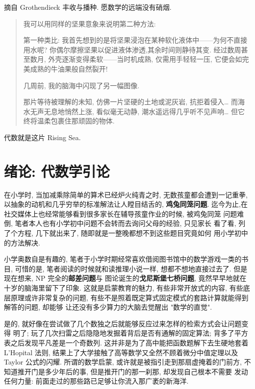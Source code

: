 \documentclass[UTF8]{book}
\begin{document}
\vspace*{5em}

摘自 Grothendieck 丰收与播种. 愿数学的远端没有硝烟. 

\begin{quotation}
    
    \kaishu   
    我可以用同样的坚果意象来说明第二种方法: 
    
    第一种类比: 
    我首先想到的是将坚果浸泡在某种软化液体中——为何不直接用水呢? 
    你偶尔摩擦坚果以促进液体渗透,其余时间则静待其变. 
    经过数周甚至数月, 外壳逐渐变得柔软——当时机成熟, 仅需用手轻轻一压, 
    它便会如完美成熟的牛油果般自然裂开! 

    几周前, 我的脑海中闪现了另一幅图像. 
      
    那片等待被理解的未知, 仿佛一片坚硬的土地或泥灰岩, 抗拒着侵入\dots
    而海水无声无息地悄然上涨, 看似毫无动静, 潮水遥远得几乎听不见声响\dots 
    但它终将温柔包裹住那顽固的物体. 
    
\end{quotation}

代数就是这片 Rising Sea. 

\chapter{绪论: 代数学引论}


在小学时, 当加减乘除简单的算术已经炉火纯青之时, 无数孩童都会遭到一记重拳, 
以抽象的动机和几乎穷举的标准解法让人瞠目结舌的, \textbf{鸡兔同笼问题}. 
迄今为止,在社交媒体上也经常能够看到很多家长在辅导孩童作业的时候, 被鸡兔同笼
问题难倒, 笔者本人也有小学初中问题不会转而去询问父母的经验, 只见家长
看了看, 列了个方程, 几下就出来了, 随即就是一整晚都想不到这些题目究竟如何
用小学初中的方法解决. 

小学奥数自是有趣的, 笔者于小学时期经常喜欢借阅图书馆中的数学游戏一类的书目, 
可惜的是, 笔者阅读的时候就和读推理小说一样, 想都不想地直接过去了. 
但是现在想来, NP 完全的\textbf{邮差问题}与
图论诞生的\textbf{戈尼斯堡七桥问题}, 竟然早早地就在
十岁的脑海里留下了印象. 
这就是启蒙教育的魅力, 有些非常开放式的内容, 有些底层原理或许非常复杂的问题, 
有些不是照着既定算式固定模式的套路计算就能得到解答的问题, 却能够
让还没有多少算力的大脑去觉醒出 "数学的直觉". 

是的, 就好像在尝试做了几个数独之后就能够反应过来怎样的检索方式会让问题变得
明了; 玩了几次扫雷之后隐隐地发掘着背后是否有通解的固定算法; 
背多了平方表之后发现平凡差是一个奇数列. 
这并非是为了高中能把函数题解下去生硬地套着 L'Hopital 法则, 
结果上了大学接触了高等数学又全然不顾着微分中值定理以及 Taylor 公式的闪耀. 
所谓的数学启蒙, 或许就是被指引走到那扇虚掩着的门前方, 
不知道推开门是多少年后的事, 但是推开门的那一刹那, 却发现自己根本不需要
发动任何力量: 前面走过的那些路已足够让你流入那广袤的新海洋. 
\end{document}
